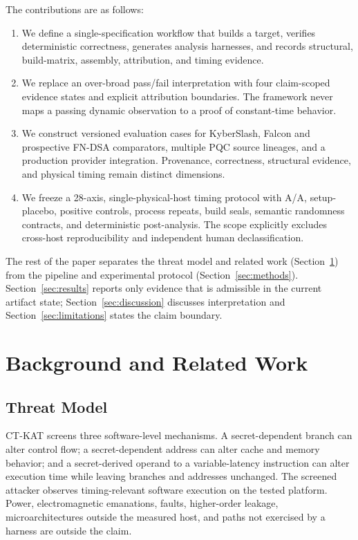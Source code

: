 \documentclass[cryptography,article,submit,moreauthors]{Definitions/mdpi}
\begin{document}
The contributions are as follows:

\begin{enumerate}
\item We define a single-specification workflow that builds a target, verifies
      deterministic correctness, generates analysis harnesses, and records
      structural, build-matrix, assembly, attribution, and timing evidence.
\item We replace an over-broad pass/fail interpretation with four
      claim-scoped evidence states and explicit attribution boundaries. The
      framework never maps a passing dynamic observation to a proof of
      constant-time behavior.
\item We construct versioned evaluation cases for KyberSlash, Falcon and
      prospective FN-DSA comparators, multiple PQC source lineages, and a
      production provider integration. Provenance, correctness, structural
      evidence, and physical timing remain distinct dimensions.
\item We freeze a 28-axis, single-physical-host timing protocol with A/A,
      setup-placebo, positive controls, process repeats, build seals, semantic
      randomness contracts, and deterministic post-analysis. The scope
      explicitly excludes cross-host reproducibility and independent human
      declassification.
\end{enumerate}

The rest of the paper separates the threat model and related work
(Section~\ref{sec:background}) from the pipeline and experimental protocol
(Section~\ref{sec:methods}). Section~\ref{sec:results} reports only evidence
that is admissible in the current artifact state; Section~\ref{sec:discussion}
discusses interpretation and Section~\ref{sec:limitations} states the claim
boundary.

\section{Background and Related Work}
\label{sec:background}

\subsection{Threat Model}

CT-KAT screens three software-level mechanisms. A secret-dependent branch can
alter control flow; a secret-dependent address can alter cache and memory
behavior; and a secret-derived operand to a variable-latency instruction can
alter execution time while leaving branches and addresses unchanged. The
screened attacker observes timing-relevant software execution on the tested
platform. Power, electromagnetic emanations, faults, higher-order leakage,
microarchitectures outside the measured host, and paths not exercised by a
harness are outside the claim.
\end{document}
